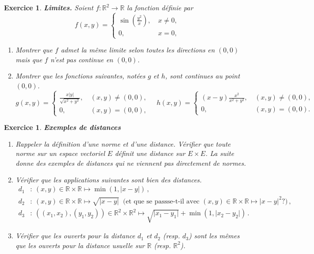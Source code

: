 \documentclass[11pt,a4paper]{article}
\newcommand{\R}{\mathbb{R}}
\newcommand{\abs}[1]{\vert #1 \vert}
\newcounter{ex}
\newtheorem{exs}[ex]{Exercice}
\newenvironment{exo}{\begin{exs}\rm}{\end{exs}\vspace{.1cm}}
\begin{document}
\begin{exo}\textbf{Limites.} Soient $f:\R^2\longrightarrow\R$ la fonction définie par
\begin{equation*}
f(x,y)=
\begin{cases}
\sin(\frac{y^2}{x}),&\ x\neq0,\\
0,&\ x=0,
\end{cases}    
\end{equation*}
\begin{enumerate}
\item Montrer que $f$ admet la même limite selon toutes les directions en $(0,0)$ mais que $f$ n'est pas continue en $(0,0)$. 
\item Montrer que les fonctions suivantes, notées $g$ et $h$, sont continues au point $(0,0)$.
\begin{equation*}
g(x,y)=
\begin{cases}
\frac{x|y|}{\sqrt{x^2+y^2}},&\ (x,y)\neq(0,0),\\
0,&\ (x,y)=(0,0),
\end{cases}
\quad 
h(x,y)=
\begin{cases}
(x-y)\frac{x^2}{x^2+y^2},&\ (x,y)\neq(0,0),\\
0,&\ (x,y)=(0,0).
\end{cases}
\end{equation*}
\end{enumerate}
\end{exo}


\begin{exo} \textbf{Exemples de distances}\\
\begin{enumerate}
\item Rappeler la d\'efinition d'une norme et d'une distance. 
V\'erifier que toute norme sur un espace vectoriel $E$ d\'efinit une distance
sur $E \times E$. La suite donne des exemples de distances qui ne viennent pas 
directement de normes.
    \item V\'erifier que les applications suivantes sont bien des distances.
    \begin{align*}
    d_1&:\ (x,y)\in\R\times\R\mapsto \min(1,\abs{x-y})\,,\\
    d_2&:\ (x,y)\in\R\times\R\mapsto\sqrt{\abs{x-y}}
    \  \text{ (et que se passse-t-il avec $(x,y)\in\R\times\R\mapsto \abs{x-y}^2$?)}
    \,,\\
    d_3&:\ ((x_1,x_2),(y_1,y_2))\in\R^2\times\R^2 \mapsto \sqrt{\abs{x_1-y_1}}+\min(1,\abs{x_2-y_2})\,. 
    \end{align*}
    \item Vérifier que les ouverts pour la distance $d_1$ et $d_2$ (resp. $d_3$) sont les mêmes que les ouverts pour la distance usuelle sur $\R$ (resp. $\R^2$).
\end{enumerate}
\end{exo}
\end{document}
